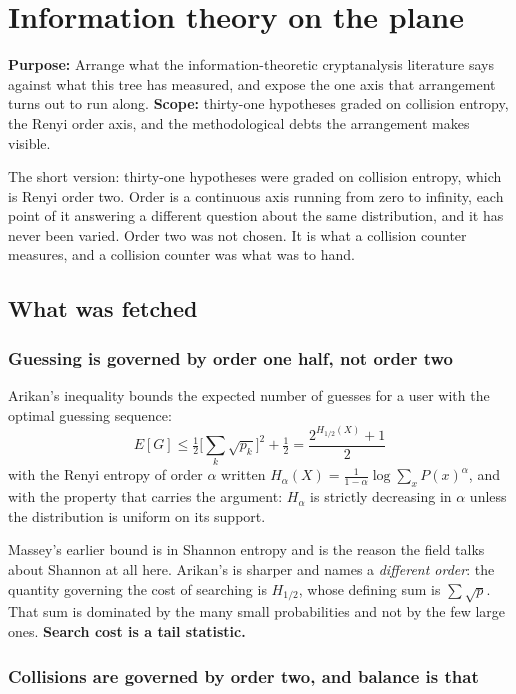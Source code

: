 \chapter{Information theory on the plane}

\textbf{Purpose:} Arrange what the information-theoretic cryptanalysis literature says against what this tree has measured, and expose the one axis that arrangement turns out to run along. \textbf{Scope:} thirty-one hypotheses graded on collision entropy, the Renyi order axis, and the methodological debts the arrangement makes visible.

The short version: thirty-one hypotheses were graded on collision entropy, which is Renyi order two. Order is a continuous axis running from zero to infinity, each point of it answering a different question about the same distribution, and it has never been varied. Order two was not chosen. It is what a collision counter measures, and a collision counter was what was to hand.

\section{What was fetched}

\subsection{Guessing is governed by order one half, not order two}

Arikan's inequality bounds the expected number of guesses for a user with the optimal guessing sequence:
\[
E[G] \le \tfrac{1}{2}\Big[\sum_k \sqrt{p_k}\Big]^2 + \tfrac{1}{2} = \frac{2^{H_{1/2}(X)} + 1}{2}
\]
with the Renyi entropy of order \(\alpha\) written \(H_\alpha(X) = \frac{1}{1-\alpha}\log \sum_x P(x)^\alpha\), and with the property that carries the argument: \(H_\alpha\) is strictly decreasing in \(\alpha\) unless the distribution is uniform on its support.

Massey's earlier bound is in Shannon entropy and is the reason the field talks about Shannon at all here. Arikan's is sharper and names a \emph{different order}: the quantity governing the cost of searching is \(H_{1/2}\), whose defining sum is \(\sum \sqrt{p}\). That sum is dominated by the many small probabilities and not by the few large ones. \textbf{Search cost is a tail statistic.}

\subsection{Collisions are governed by order two, and balance is that}

